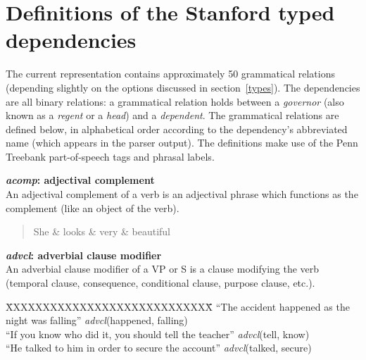 \documentclass[11pt,letterpaper]{article}
\begin{document}
\section{Definitions of the Stanford typed dependencies}\label{def}

The current representation contains approximately 50 grammatical
relations (depending slightly on the options discussed in section~\ref{types}). The dependencies are all binary relations: a grammatical relation holds between a \emph{governor} (also known as a \emph{regent} or a \emph{head}) and a \emph{dependent}. The grammatical relations are defined below, in alphabetical order according to the dependency's abbreviated name (which appears in the parser output). The definitions make use of the Penn Treebank part-of-speech tags and phrasal labels.

\bigskip

\noindent\textbf{\emph{acomp}: adjectival complement}\\
An adjectival complement of a verb is an adjectival phrase which functions as the complement (like an object of the verb).
\begin{quote}
\begin{dependency}[column sep=0.2em, edge unit distance=2.25ex]
  \begin{deptext}
    She \& looks \& very \& beautiful \\
  \end{deptext}
\end{dependency}
\end{quote}


\noindent\textbf{\emph{advcl}: adverbial clause modifier}\\
An adverbial clause modifier of a VP or S is a clause modifying the
verb (temporal clause, consequence, conditional clause, purpose
clause, etc.).
\begin{tabbing}
	\hspace{1cm} \=XXXXXXXXXXXXXXXXXXXXXXXXXXXX\= \hspace{1cm}\=  \kill
\> ``The accident happened as the night was falling'' \> \> \emph{advcl}(happened, falling)\\
\> ``If you know who did it, you should tell the teacher'' \> \> \emph{advcl}(tell, know)\\
\> ``He talked to him in order to secure the account'' \>  \> \emph{advcl}(talked, secure)\\
\end{tabbing}
\end{document}
